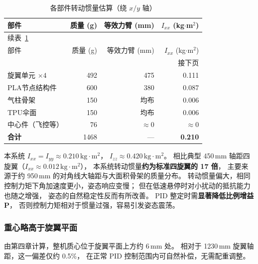 \begin{longtable}{lrrr}
    \caption{各部件转动惯量估算（绕 $x/y$ 轴）}
    \label{tab:inertia} \\
    \toprule
    部件 & 质量 (g) & 等效力臂 (mm) & $I_{xx}$ (kg$\cdot$m$^2$) \\
    \midrule
    \endfirsthead
    \multicolumn{4}{l}{\small 续表~\ref*{tab:inertia}} \\[2pt]
    \toprule
    部件 & 质量 (g) & 等效力臂 (mm) & $I_{xx}$ (kg$\cdot$m$^2$) \\
    \midrule
    \endhead
    \midrule
    \multicolumn{4}{r}{\small 接下页} \\
    \endfoot
    \bottomrule
    \endlastfoot
    旋翼单元 $\times 4$  & 492 & 475        & 0.111 \\[3pt]
    PLA节点结构件        & 600 & 380        & 0.087 \\[3pt]
    气柱骨架             & 150 & 均布        & 0.006 \\[3pt]
    TPU伞面             & 150 & 均布        & 0.006 \\[3pt]
    中心件（飞控等）      &  76 & $\approx 0$ & $\approx 0$ \\
    \midrule
    \textbf{合计}        & 1468 & —           & \textbf{0.210} \\
\end{longtable}


本系统 $I_{xx} = I_{yy} \approx 0.210\,\text{kg}\cdot\text{m}^2$，
$I_{zz} \approx 0.420\,\text{kg}\cdot\text{m}^2$。
相比典型 450\,mm 轴距四旋翼（$I_{xx} \approx 0.012\,\text{kg}\cdot\text{m}^2$），
本系统转动惯量\textbf{约为标准四旋翼的 17 倍}，
主要来源于约 950\,mm 的对角线大轴距与大面积骨架的质量分布。
转动惯量偏大，相同控制力矩下角加速度更小，姿态响应变慢；
但在低速悬停时对小扰动的抵抗能力也随之增强，
姿态的自然稳定性反而有所改善。
PID 整定时需\textbf{显著降低比例增益 P}，
否则控制力矩相对于惯量过强，容易引发姿态震荡。

\subsubsection{重心略高于旋翼平面}

由第四章计算，整机质心位于旋翼平面上方约 6\,mm 处。
相对于 1230\,mm 旋翼轴距，这一偏差仅约 0.5\%，
在正常 PID 控制范围内可自然补偿，无需配重调整。


